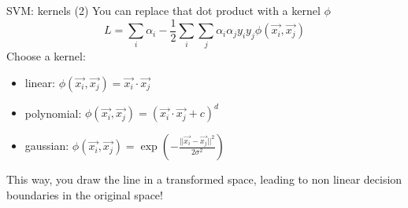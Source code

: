 \begin{frame}{SVM: kernels (2)}
You can replace that dot product with a kernel $\phi$
\begin{equation}
L = \sum_i \alpha_i - \frac{1}{2} \sum_i \sum_j \alpha_i \alpha_j y_i y_j \phi(\vec{x_i}, \vec{x_j})
\end{equation}
Choose a kernel:
\begin{itemize}
\item linear: $\phi(\vec{x_i}, \vec{x_j}) = \vec{x_i}\cdot\vec{x_j}$
\item polynomial: $\phi(\vec{x_i}, \vec{x_j}) = (\vec{x_i}\cdot\vec{x_j}+c)^d$
\item gaussian: $\phi(\vec{x_i}, \vec{x_j}) = \exp(-\frac{||\vec{x_i}-\vec{x_j}||^2}{2\sigma^2})$
\end{itemize}
This way, you draw the line in a transformed space, leading to non linear decision boundaries in the original space!
\end{frame}